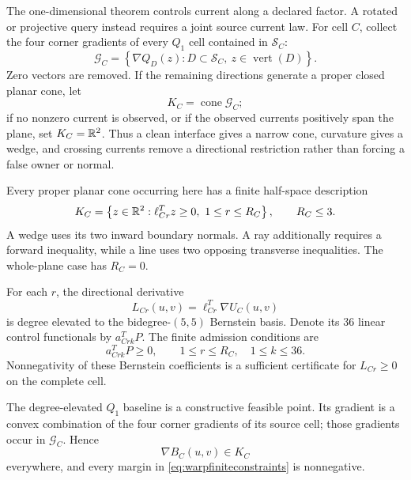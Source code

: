 The one-dimensional theorem controls current along a declared factor.  A
rotated or projective query instead requires a joint source current law.  For
cell \(C\), collect the four corner gradients of every \(Q_1\) cell contained
in \(\mathcal S_C\):
\begin{equation}
 \mathcal G_C=
 \left\{\nabla Q_D(z):D\subset\mathcal S_C,
              \ z\in\operatorname{vert}(D)\right\}.
 \label{eq:warpgenerators}
\end{equation}
Zero vectors are removed.  If the remaining directions generate a proper
closed planar cone, let
\begin{equation}
 K_C=\operatorname{cone}\mathcal G_C;
 \label{eq:warpcone}
\end{equation}
if no nonzero current is observed, or if the observed currents positively
span the plane, set \(K_C=\mathbb{R}^2\).  Thus a clean interface gives a narrow
cone, curvature gives a wedge, and crossing currents remove a directional
restriction rather than forcing a false owner or normal.

Every proper planar cone occurring here has a finite half-space description
\begin{equation}
 K_C=\left\{z\in\mathbb{R}^2:\ell_{Cr}^Tz\geq0,
                       \ 1\leq r\leq R_C\right\},
 \qquad R_C\leq3.
 \label{eq:warpconedual}
\end{equation}
A wedge uses its two inward boundary normals.  A ray additionally requires a
forward inequality, while a line uses two opposing transverse inequalities.
The whole-plane case has \(R_C=0\).

For each \(r\), the directional derivative
\begin{equation}
 L_{Cr}(u,v)=\ell_{Cr}^T\nabla U_C(u,v)
 \label{eq:warpdirectional}
\end{equation}
is degree elevated to the bidegree-\((5,5)\) Bernstein basis.  Denote its 36
linear control functionals by \(a_{Crk}^TP\).  The finite admission
conditions are
\begin{equation}
 a_{Crk}^TP\geq0,\qquad
 1\leq r\leq R_C,\quad 1\leq k\leq36.
 \label{eq:warpfiniteconstraints}
\end{equation}
Nonnegativity of these Bernstein coefficients is a sufficient certificate
for \(L_{Cr}\geq0\) on the complete cell.

The degree-elevated \(Q_1\) baseline is a constructive feasible point.  Its
gradient is a convex combination of the four corner gradients of its source
cell; those gradients occur in \(\mathcal G_C\).  Hence
\begin{equation}
 \nabla B_C(u,v)\in K_C
 \label{eq:warpbaselinefeasible}
\end{equation}
everywhere, and every margin in \eqref{eq:warpfiniteconstraints} is
nonnegative.

